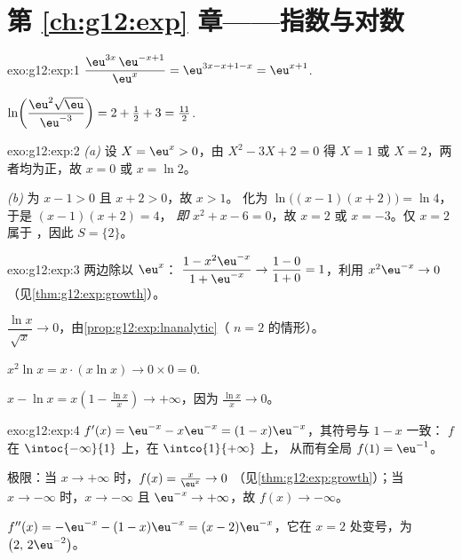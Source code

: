 \section*{第 \ref{ch:g12:exp} 章——指数与对数}

\begin{solution}{exo:g12:exp:1}
$\dfrac{\eu^{3x}\,\eu^{-x+1}}{\eu^{x}} = \eu^{3x - x + 1 - x} = \eu^{x+1}$.

$\ln\!\left(\dfrac{\eu^2\sqrt{\eu}}{\eu^{-3}}\right)
= 2 + \tfrac12 + 3 = \tfrac{11}{2}$.
\end{solution}

\begin{solution}{exo:g12:exp:2}
\emph{(a)} 设 $X = \eu^x > 0$，由 $X^2 - 3X + 2 = 0$ 得
$X = 1$ 或 $X = 2$，两者均为正，故 $x = 0$ 或 $x = \ln 2$。

\emph{(b)} 为 $x - 1 > 0$ 且 $x + 2 > 0$，故 $x > 1$。
化为 $\ln\bigl((x-1)(x+2)\bigr) = \ln 4$，于是 $(x-1)(x+2) = 4$，
\emph{即} $x^2 + x - 6 = 0$，故 $x = 2$ 或 $x = -3$。仅 $x = 2$ 属于
，因此 $S = \{2\}$。
\end{solution}

\begin{solution}{exo:g12:exp:3}
两边除以 $\eu^x$：
$\dfrac{1 - x^2\eu^{-x}}{1 + \eu^{-x}} \to \dfrac{1-0}{1+0} = 1$，利用
$x^2 \eu^{-x} \to 0$（见\cref{thm:g12:exp:growth}）。

$\dfrac{\ln x}{\sqrt x} \to 0$，由\cref{prop:g12:exp:lnanalytic}（
$n = 2$ 的情形）。

$x^2 \ln x = x \cdot (x \ln x) \to 0 \times 0 = 0$.

$x - \ln x = x\left(1 - \frac{\ln x}{x}\right) \to +\infty$，因为
$\frac{\ln x}{x} \to 0$。
\end{solution}

\begin{solution}{exo:g12:exp:4}
$f'(x) = \eu^{-x} - x\eu^{-x} = (1 - x)\eu^{-x}$，其符号与 $1 - x$ 一致：
$f$ 在 $\intoc{-\infty}{1}$ 上，在 $\intco{1}{+\infty}$ 上，
从而有全局 $f(1) = \eu^{-1}$。

极限：当 $x \to +\infty$ 时，$f(x) = \frac{x}{\eu^x} \to 0$
（见\cref{thm:g12:exp:growth}）；当 $x \to -\infty$ 时，$x \to -\infty$ 且
$\eu^{-x} \to +\infty$，故 $f(x) \to -\infty$。

$f''(x) = -\eu^{-x} - (1-x)\eu^{-x} = (x - 2)\eu^{-x}$，它在
$x = 2$ 处变号，为 $\bigl(2,\, 2\eu^{-2}\bigr)$。
\end{solution}

